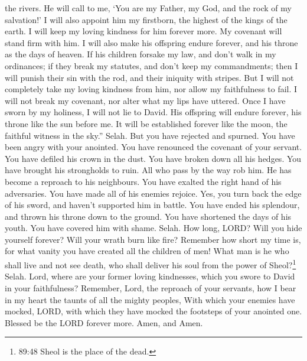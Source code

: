 the rivers.  He will call to me, `You are my Father, my
God, and the rock of my salvation!'  I will also appoint
him my firstborn, the highest of the kings of the earth.  I
will keep my loving kindness for him forever more. My covenant will
stand firm with him.  I will also make his offspring endure
forever, and his throne as the days of heaven.  If his
children forsake my law, and don't walk in my ordinances; 
if they break my statutes, and don't keep my commandments; 
then I will punish their sin with the rod, and their iniquity with
stripes.  But I will not completely take my loving kindness
from him, nor allow my faithfulness to fail.  I will not
break my covenant, nor alter what my lips have uttered. 
Once I have sworn by my holiness, I will not lie to David. 
His offspring will endure forever, his throne like the sun before me.
 It will be established forever like the moon, the faithful
witness in the sky.'' Selah.  But you have rejected and
spurned. You have been angry with your anointed.  You have
renounced the covenant of your servant. You have defiled his crown in
the dust.  You have broken down all his hedges. You have
brought his strongholds to ruin.  All who pass by the way
rob him. He has become a reproach to his neighbours.  You
have exalted the right hand of his adversaries. You have made all of his
enemies rejoice.  Yes, you turn back the edge of his sword,
and haven't supported him in battle.  You have ended his
splendour, and thrown his throne down to the ground.  You
have shortened the days of his youth. You have covered him with shame.
Selah.  How long, LORD? Will you hide yourself forever?
Will your wrath burn like fire?  Remember how short my time
is, for what vanity you have created all the children of men!
 What man is he who shall live and not see death, who shall
deliver his soul from the power of Sheol?\footnote{89:48 Sheol is the
  place of the dead.} Selah.  Lord, where are your former
loving kindnesses, which you swore to David in your faithfulness?
 Remember, Lord, the reproach of your servants, how I bear
in my heart the taunts of all the mighty peoples,  With
which your enemies have mocked, LORD, with which they have mocked the
footsteps of your anointed one.  Blessed be the LORD
forever more. Amen, and Amen.

